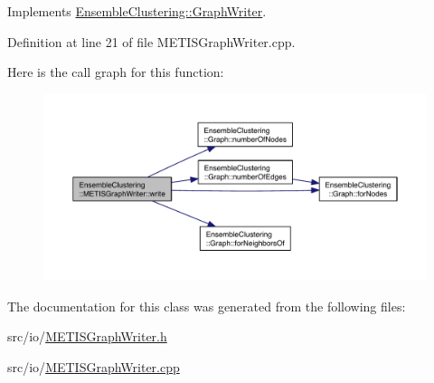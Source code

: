Implements \hyperlink{class_ensemble_clustering_1_1_graph_writer_ac10beacbc0645b9c0346600f612438c4}{Ensemble\-Clustering\-::\-Graph\-Writer}.



Definition at line 21 of file M\-E\-T\-I\-S\-Graph\-Writer.\-cpp.



Here is the call graph for this function\-:
\nopagebreak
\begin{figure}[H]
\begin{center}
\leavevmode
\includegraphics[width=350pt]{class_ensemble_clustering_1_1_m_e_t_i_s_graph_writer_aff929d423e15fe00ca051f210d9484f0_cgraph}
\end{center}
\end{figure}




The documentation for this class was generated from the following files\-:\begin{DoxyCompactItemize}
\item 
src/io/\hyperlink{_m_e_t_i_s_graph_writer_8h}{M\-E\-T\-I\-S\-Graph\-Writer.\-h}\item 
src/io/\hyperlink{_m_e_t_i_s_graph_writer_8cpp}{M\-E\-T\-I\-S\-Graph\-Writer.\-cpp}\end{DoxyCompactItemize}

